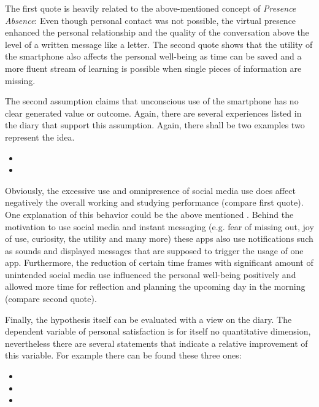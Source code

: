 \documentclass[11pt,a4paper]{article}
\begin{document}
The first quote is heavily related to the above-mentioned concept of \textit{Presence Absence}: Even though personal contact was not possible, the virtual presence enhanced the personal relationship and the quality of the conversation above the level of a written message like a letter. The second quote shows that the utility of the smartphone also affects the personal well-being as time can be saved and a more fluent stream of learning is possible when single pieces of information are missing.

The second assumption claims that unconscious use of the smartphone has no clear generated value or outcome. Again, there are several experiences listed in the diary that support this assumption. Again, there shall be two examples two represent the idea.

\begin{itemize}
\item {}
\item {}
\end{itemize}

Obviously, the excessive use and omnipresence of social media use does affect negatively the overall working and studying performance (compare first quote). One explanation of this behavior could be the above mentioned  \citep{Fogg.2015}. Behind the motivation to use social media and instant messaging (e.g. fear of missing out, joy of use, curiosity, the utility and many more) these apps also use notifications such as sounds and displayed messages that are supposed to trigger the usage of one app. Furthermore, the reduction of certain time frames with significant amount of unintended social media use influenced the personal well-being positively and allowed more time for reflection and planning the upcoming day in the morning (compare second quote). 

Finally, the hypothesis itself can be evaluated with a view on the diary. The dependent variable of personal satisfaction is for itself no quantitative dimension, nevertheless there are several statements that indicate a relative improvement of this variable. For example there can be found these three ones:

\begin{itemize}
\item {}
\item {}
\item {}
\end{itemize}
\end{document}
